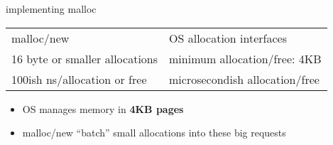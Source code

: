 \begin{frame}{implementing malloc}
\begin{tabular}{ll}
malloc/new & OS allocation interfaces \\
16 byte or smaller allocations & minimum allocation/free: 4KB \\
100ish ns/allocation or free & microsecondish allocation/free \\
\end{tabular}
\begin{itemize}
\item OS manages memory in \textbf{4KB pages}
\item malloc/new ``batch'' small allocations into these big requests
\end{itemize}
\end{frame}

